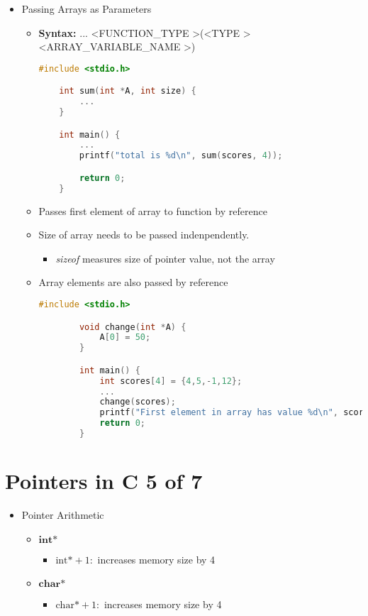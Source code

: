 \documentclass[12pt]{article}
\begin{document}
\begin{itemize}
    \item Passing Arrays as Parameters
    \begin{itemize}
        \item \textbf{Syntax:} ... \textless FUNCTION\_TYPE \textgreater(\textless TYPE \textgreater *\textless ARRAY\_VARIABLE\_NAME \textgreater)

    \begin{lstlisting}[language=c]
    #include <stdio.h>

    int sum(int *A, int size) {
        ...
    }

    int main() {
        ...
        printf("total is %d\n", sum(scores, 4));

        return 0;
    }
    \end{lstlisting}
        \item Passes first element of array to function by reference
        \item Size of array needs to be passed indenpendently.
        \begin{itemize}
            \item \textit{sizeof} measures size of pointer value, not the array
        \end{itemize}
        \item Array elements are also passed by reference

        \begin{lstlisting}[language=c]
        #include <stdio.h>

        void change(int *A) {
            A[0] = 50;
        }

        int main() {
            int scores[4] = {4,5,-1,12};
            ...
            change(scores);
            printf("First element in array has value %d\n", scores[0]); // <- returns 50, instead of 4
            return 0;
        }
        \end{lstlisting}
    \end{itemize}
\end{itemize}

\bigskip

\section*{Pointers in C 5 of 7}

\bigskip

\begin{itemize}
    \item Pointer Arithmetic
    \begin{itemize}
        \item $\textbf{int*}$
        \begin{itemize}
            \item $\text{int*}+1:$ increases memory size by 4
        \end{itemize}
        \item $\textbf{char*}$
        \begin{itemize}
            \item $\text{char*}+1:$ increases memory size by 4
        \end{itemize}
    \end{itemize}
\end{itemize}
\end{document}
